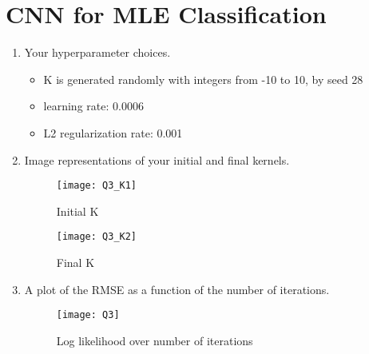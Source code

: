 \documentclass[12pt]{article}
\begin{document}
\section{CNN for MLE Classification}
\begin{enumerate}
\item Your hyperparameter choices.
\begin{itemize}
\item[]K is generated randomly with integers from -10 to 10, by seed 28
\item[]learning rate: 0.0006
\item[]L2 regularization rate: 0.001
\end{itemize}

\item Image representations of your initial and final kernels.

\begin{figure}[H]
\centering
\texttt{[image: Q3\_K1]}
\caption{Initial K}
\end{figure} 

\begin{figure}[H]
\centering
\texttt{[image: Q3\_K2]}
\caption{Final K}
\end{figure} 

\item A plot of the RMSE as a function of the number of iterations.
\begin{figure}[H]
\centering
\texttt{[image: Q3]}
\caption{Log likelihood over number of iterations}
\end{figure} 


\end{enumerate}

\newpage
\end{document}
